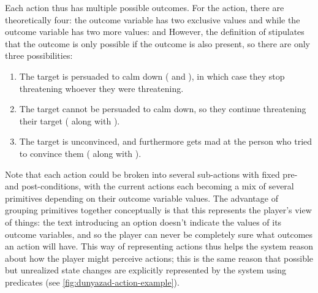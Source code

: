 Each action thus has multiple possible outcomes.
%
For the  action, there are theoretically four: the  outcome variable has two exclusive values  and  while the  outcome variable has two more values:  and 
%
However, the definition of  stipulates that the outcome  is only possible if the outcome  is also present, so there are only three possibilities:

\begin{enumerate}
  \item The target is persuaded to calm down ( and ), in which case they stop threatening whoever they were threatening.
  \item The target cannot be persuaded to calm down, so they continue threatening their target ( along with ).
  \item The target is unconvinced, and furthermore gets mad at the person who tried to convince them ( along with ).
\end{enumerate}

Note that each action could be broken into several sub-actions with fixed pre- and post-conditions, with the current actions each becoming a mix of several primitives depending on their outcome variable values.
%
The advantage of grouping primitives together conceptually is that this represents the player's view of things: the text introducing an option doesn't indicate the values of its outcome variables, and so the player can never be completely sure what outcomes an action will have.
%
This way of representing actions thus helps the system reason about how the player might perceive actions; this is the same reason that possible but unrealized state changes are explicitly represented by the system using  predicates (see \cref{fig:dunyazad-action-example}).


